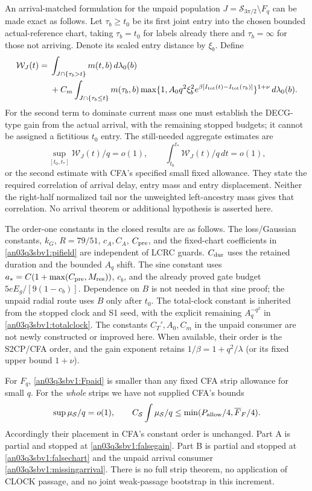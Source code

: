 \documentclass[11pt]{article}
\numberwithin{equation}{section}
\theoremstyle{remark}\newtheorem{remark}[proposition]{Remark}
\newcommand{\dd}{\,d}
\newcommand{\Sm}{\mathcal S}
\begin{document}
An arrival-matched formulation for the unpaid population
$J=\Sm_{3\pi/2}\setminus F_q$ can be made exact as follows.
Let $\tau_b\ge t_0$ be its first joint entry into the chosen bounded
actual-reference chart, taking $\tau_b=t_0$ for labels already there
and $\tau_b=\infty$ for those not arriving. Denote its scaled
entry distance by $\xi_b$. Define
\begin{align}
 \mathcal W_J(t)={}&
   \int_{J\cap\{\tau_b>t\}}m(t,b)\dd\lambda_0(b)\nonumber\\
 &+C_m\int_{J\cap\{\tau_b\le t\}}m(\tau_b,b)
    \max\{1,A_0q^2\xi_b^2
       e^{\beta[I_{\rm tot}(t)-I_{\rm tot}(\tau_b)]}\}^{1+\nu}
          \dd\lambda_0(b).                         \label{an03q3sbv1:arrival}
\end{align}
For the second term to dominate current mass one must establish the
DECG-type gain from the actual arrival, with the remaining stopped
budgets; it cannot be assigned a fictitious $t_0$ entry.
The still-needed aggregate estimates are
\begin{equation}
 \sup_{[t_0,t_*]}\mathcal W_J(t)/q=o(1),\qquad
 \int_{t_0}^{t_*}\mathcal W_J(t)/q\dd t=o(1),
 \label{an03q3sbv1:missingarrival}
\end{equation}
or the second estimate with CFA's specified small fixed allowance.
They state the required correlation of arrival delay, entry mass and
entry displacement. Neither the right-half normalized tail nor the
unweighted left-ancestry mass gives that correlation.
No arrival theorem or additional hypothesis is asserted here.

The order-one constants in the closed results are as follows.
The loss/Gaussian constants, $k_G$, $R=79/51$, $c_A,C_A$,
$C_{\rm pre}$, and the fixed-chart coefficients in
\eqref{an03q3sbv1:pifield} are independent of LCRC guards.
$C_{\rm dur}$ uses the retained duration and the bounded $A_q$ shift.
The sine constant uses $a_*=C(1+\max(C_{\rm pre},M_{\rm res}))$,
$c_b$, and the already proved gate budget $5eE_g/[9(1-c_b)]$.
Dependence on $B$ is not needed in that sine proof; the unpaid radial
route uses $B$ only after $t_0$. The total-clock constant is inherited
from the stopped clock and S1 seed, with the explicit remaining
$A_q^{-q^2}$ in \eqref{an03q3sbv1:totalclock}.
The constants $C_T',A_0,C_m$ in the unpaid consumer are not newly
constructed or improved here. When available, their order is the
S2CP/CFA order, and the gain exponent retains
$1/\beta=1+q^2/\lambda$ (or its fixed upper bound $1+\nu$).

For $F_q$, \eqref{an03q3sbv1:Fpaid} is smaller than any fixed CFA strip
allowance for small $q$. For the \emph{whole} strips we have not supplied
CFA's bounds
\[
 \sup\mu_{\Sm}/q=o(1),\qquad
 C_{\Sm}\int\mu_{\Sm}/q
   \le\min(P_{\rm allow}/4,\overline F_F/4).
\]
Accordingly their placement in CFA's constant order is unchanged.
Part A is partial and stopped at \eqref{an03q3sbv1:falsegain}.
Part B is partial and stopped at \eqref{an03q3sbv1:falsechart}
and the unpaid arrival consumer \eqref{an03q3sbv1:missingarrival}.
There is no full strip theorem, no application of CLOCK passage,
and no joint weak-passage bootstrap in this increment.
\end{document}
